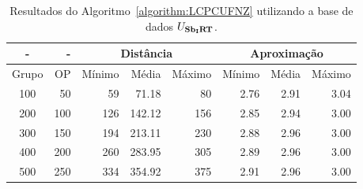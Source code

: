 \begin{table}[!htb]
  \caption{Resultados do Algoritmo~\ref{algorithm:LCPCUFNZ} utilizando a base de dados $U_{\textbf{Sb\textsubscript{I}RT}}{}$.}
  \label{table:ZGIFXHSX}
  \centering
  \begin{tabular}{|c|r|r|r|r|r|r|r|}
    \hline
      -      &  -   & \multicolumn{3}{c|}{Distância}             & \multicolumn{3}{c|}{Aproximação}           \\ \hline
    Grupo    & OP   & Mínimo       & Média        & Máximo       & Mínimo       & Média        & Máximo       \\ \hline  
    100      & 50   & 59           &  71.18       & 80           & 2.76         & 2.91         & 3.04         \\ \hline
    200      & 100  & 126          & 142.12       & 156          & 2.85         & 2.94         & 3.00         \\ \hline
    300      & 150  & 194          & 213.11       & 230          & 2.88         & 2.96         & 3.00         \\ \hline
    400      & 200  & 260          & 283.95       & 305          & 2.89         & 2.96         & 3.00         \\ \hline
    500      & 250  & 334          & 354.92       & 375          & 2.91         & 2.96         & 3.00         \\ \hline    
  \end{tabular}
\end{table}